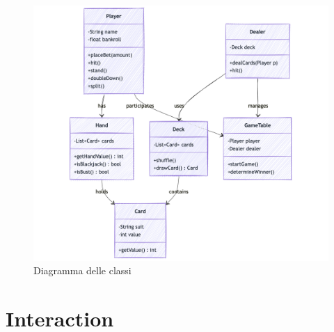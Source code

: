 \begin{figure}[!htb]
    \centering
    \includegraphics[scale=0.55]{report/img/classDiagram.png}
    \caption{Diagramma delle classi}
    \label{fig:classDiagram}
\end{figure}

\section{Interaction}


